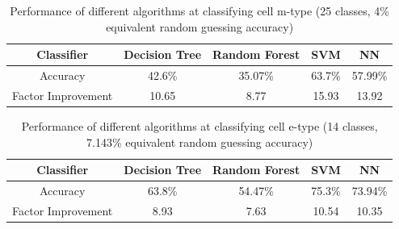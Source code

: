 \begin{table}[h]
    \centering
    \begin{tabular}{|c||c|c|c|c|}
        \hline
        Classifier & Decision Tree & Random Forest & SVM & NN\\
        \hline\hline
        Accuracy & 42.6\% & 35.07\% & 63.7\% &57.99\%\\
        \hline
        Factor Improvement & 10.65 & 8.77 & 15.93 &13.92\\
        \hline
    \end{tabular}
    \caption{Performance of different algorithms at classifying cell m-type (25 classes, 4\% equivalent random guessing accuracy)}
    \label{tbl:mtypeClassifierPerf}
\end{table}

\begin{table}[h]
    \centering
    \begin{tabular}{|c||c|c|c|c|}
        \hline
        Classifier & Decision Tree & Random Forest & SVM & NN\\
        \hline\hline
        Accuracy & 63.8\% & 54.47\% & 75.3\% &73.94\%\\
        \hline
        Factor Improvement & 8.93 & 7.63 & 10.54 &10.35\\
        \hline
    \end{tabular}
    \caption{Performance of different algorithms at classifying cell e-type (14 classes, 7.143\% equivalent random guessing accuracy)}
    \label{tbl:etypeClassifierPerf}
\end{table}

\par

